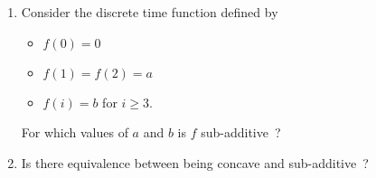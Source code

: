 \begin{problem}
\begin{enumerate}
        \item  Consider the discrete
time function defined by
\begin{itemize}
        \item  $f(0)=0$
        \item  $f(1)=f(2)=a$
        \item  $f(i)=b$ for $i \geq 3$.
\end{itemize}

For which values of $a$ and $b$ is $f$ sub-additive~? 
        \item  Is there equivalence between being concave and sub-additive~?
\end{enumerate}
\end{problem}
